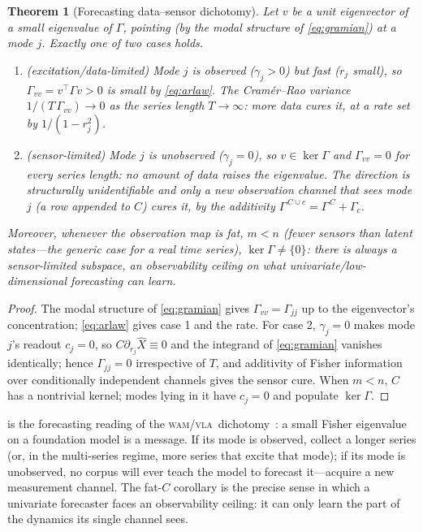 \documentclass[10pt]{article}
\theoremstyle{plain}
\newtheorem{theorem}{Theorem}[section]
\theoremstyle{definition}
\theoremstyle{remark}
\newcommand{\Gam}{\Gamma}
\newcommand{\WAM}{\textsc{wam}}
\newcommand{\VLA}{\textsc{vla}}
\begin{document}
\begin{theorem}[Forecasting data--sensor dichotomy]\label{thm:forecastdichotomy}
Let $v$ be a unit eigenvector of a small eigenvalue of $\Gam$, pointing (by the
modal structure of \eqref{eq:gramian}) at a mode $j$. Exactly one of two cases
holds.
\begin{enumerate}[leftmargin=1.7em,itemsep=1pt]
\item \textup{(excitation/data-limited)} Mode $j$ is observed ($\gamma_j>0$) but
fast ($r_j$ small), so $\Gam_{vv}=v^\top\Gam v>0$ is small by \eqref{eq:arlaw}.
The Cram\'er--Rao variance $1/(T\,\Gam_{vv})\to0$ as the series length $T\to\infty$:
\emph{more data cures it}, at a rate set by $1/(1-r_j^2)$.
\item \textup{(sensor-limited)} Mode $j$ is unobserved ($\gamma_j=0$), so
$v\in\ker\Gam$ and $\Gam_{vv}=0$ for \emph{every} series length: no amount of
data raises the eigenvalue. The direction is structurally unidentifiable and
only a new observation channel that sees mode $j$ (a row appended to $C$) cures
it, by the additivity $\Gam^{\,C\cup c}=\Gam^{\,C}+\Gam_c$.
\end{enumerate}
Moreover, whenever the observation map is \emph{fat}, $m<n$ (fewer sensors than
latent states---the generic case for a real time series), $\ker\Gam\neq\{0\}$:
there is always a sensor-limited subspace, an \emph{observability ceiling} on
what univariate/low-dimensional forecasting can learn.
\end{theorem}
\begin{proof}
The modal structure of \eqref{eq:gramian} gives $\Gam_{vv}=\Gam_{jj}$ up to the
eigenvector's concentration; \eqref{eq:arlaw} gives case 1 and the rate. For case
2, $\gamma_j=0$ makes mode $j$'s readout $c_j=0$, so $C\partial_{r_j}\hat X\equiv
0$ and the integrand of \eqref{eq:gramian} vanishes identically; hence
$\Gam_{jj}=0$ irrespective of $T$, and additivity of Fisher information over
conditionally independent channels gives the sensor cure. When $m<n$, $C$ has a
nontrivial kernel; modes lying in it have $c_j=0$ and populate $\ker\Gam$.
\end{proof}

 is the forecasting reading of the \WAM/\VLA\
dichotomy~\cite[Thm.~11.3]{wamvla}: a small Fisher eigenvalue on a foundation
model is a message. If its mode is observed, collect a longer series (or, in the
multi-series regime, more series that excite that mode); if its mode is
unobserved, no corpus will ever teach the model to forecast it---acquire a new
measurement channel. The fat-$C$ corollary is the precise sense in which a
univariate forecaster faces an observability ceiling: it can only learn the part
of the dynamics its single channel sees.
\end{document}
